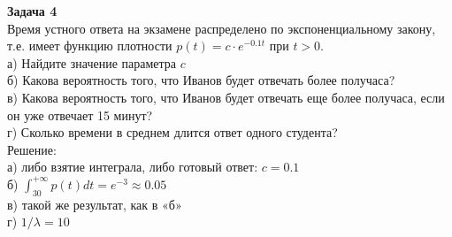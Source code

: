 \documentclass[12pt, a4paper]{article}\usepackage[]{graphicx}\usepackage[]{color}
\begin{document}
	\textbf{Задача 4} \\ %
	Время устного ответа на экзамене распределено по экспоненциальному закону, т.е. имеет функцию плотности $p(t)=c\cdot e^{-0.1t}$ при $t>0$. \\
	а) Найдите значение параметра $c$ \\
	б) Какова вероятность того, что Иванов будет отвечать более получаса? \\
	в) Какова вероятность того, что Иванов будет отвечать еще более получаса, если он уже отвечает 15 минут? \\
	г) Сколько времени в среднем длится ответ одного студента? \\
	Решение: \\
	а) либо взятие интеграла, либо готовый ответ: $c=0.1$ \\
	б) $\int_{30}^{+\infty}p(t)dt=e^{-3}\approx 0.05$ \\
	в) такой же результат, как в «б» \\
	г) $1/\lambda=10$ \\




\end{document}
